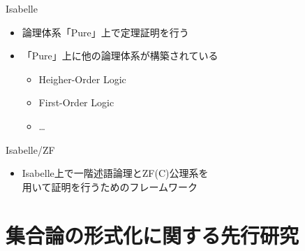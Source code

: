 \documentclass[17pt,aspectratio=169]{beamer}
\begin{document}


\begin{frame}{Isabelle}
    \begin{itemize}
        \item 論理体系「Pure」上で定理証明を行う
        \item 「Pure」上に他の論理体系が構築されている
              {\small \begin{itemize}
                  \item Heigher-Order Logic
                  \item First-Order Logic \\
                  \item \dots
              \end{itemize} }
    \end{itemize}
    \vspace{-10pt}
\end{frame}


\begin{frame}{Isabelle/ZF}
    \begin{itemize}
        \item Isabelle上で一階述語論理とZF(C)公理系を\\用いて証明を行うためのフレームワーク
    \end{itemize}
\end{frame}



\section{集合論の形式化に関する先行研究 }
\end{document}
